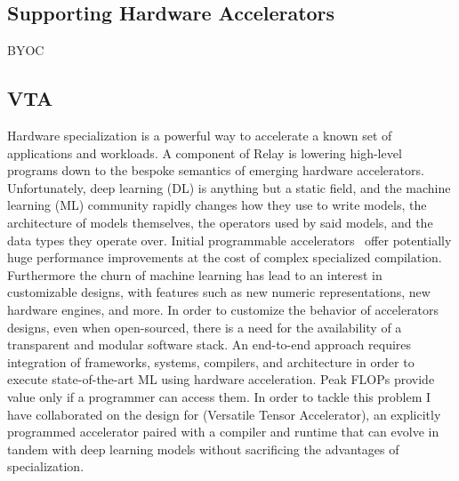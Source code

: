 
\subsection{Supporting Hardware Accelerators}
\label{sec:accel}

BYOC

\subsection{VTA}

Hardware specialization is a powerful way to accelerate
  a known set of applications and workloads.
A component of Relay is lowering high-level programs down
  to the bespoke semantics of emerging hardware accelerators.
Unfortunately, deep learning (DL) is anything but a static field, and the machine learning (ML) community
  rapidly changes how they use to write models, the architecture of models themselves, the operators
  used by said models, and the data types they operate over.
Initial programmable accelerators~\citep{tpuv1} offer potentially huge performance
  improvements at the cost of complex specialized compilation.
Furthermore the churn of machine learning has lead to an interest
  in customizable designs, with features such as new numeric representations,
  new hardware engines, and more.
In order to customize the behavior of accelerators designs, even when open-sourced,
  there is a need for the availability of a transparent and modular software stack.
An end-to-end approach requires integration of frameworks, systems, compilers,
  and architecture in order to execute state-of-the-art ML using hardware acceleration.
Peak FLOPs provide value only if a programmer can access them.
In order to tackle this problem I have collaborated on the design for \vta (Versatile Tensor Accelerator),
  an explicitly programmed accelerator paired with a compiler and runtime that can evolve
  in tandem with deep learning models without sacrificing the advantages of specialization.

